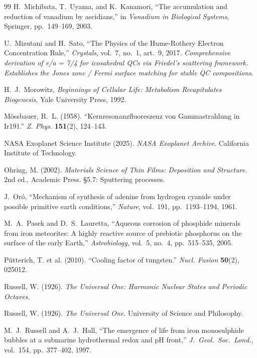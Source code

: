 \documentclass[12pt,oneside]{book}
\begin{document}
\begin{thebibliography}{99}
H.~Michibata, T.~Uyama, and K.~Kanamori,
``The accumulation and reduction of vanadium by ascidians,''
in \emph{Vanadium in Biological Systems}, Springer, pp.~149--169, 2003.

U.~Mizutani and H.~Sato,
``The Physics of the Hume-Rothery Electron Concentration Rule,''
\emph{Crystals}, vol.~7, no.~1, art.~9, 2017.
\textit{Comprehensive derivation of e/a = 7/4 for icosahedral QCs via Friedel's scattering framework. Establishes the Jones zone / Fermi surface matching for stable QC compositions.}

H.~J.~Morowitz,
\emph{Beginnings of Cellular Life: Metabolism Recapitulates Biogenesis},
Yale University Press, 1992.

M\"ossbauer, R.~L. (1958).
``Kernresonanzfluoreszenz von Gammastrahlung in Ir191.''
\textit{Z. Phys.} \textbf{151}(2), 124--143.

NASA Exoplanet Science Institute (2025).
\textit{NASA Exoplanet Archive}. California Institute of Technology.

Ohring, M. (2002).
\textit{Materials Science of Thin Films: Deposition and Structure}.
2nd ed., Academic Press. \S5.7: Sputtering processes.

J.~Or\'o,
``Mechanism of synthesis of adenine from hydrogen cyanide under possible primitive earth conditions,''
\emph{Nature}, vol.~191, pp.~1193--1194, 1961.

M.~A.~Pasek and D.~S.~Lauretta,
``Aqueous corrosion of phosphide minerals from iron meteorites: A highly reactive source of prebiotic phosphorus on the surface of the early Earth,''
\emph{Astrobiology}, vol.~5, no.~4, pp.~515--535, 2005.

P\"utterich, T. et al. (2010).
``Cooling factor of tungsten.''
\textit{Nucl. Fusion} \textbf{50}(2), 025012.

Russell, W. (1926).
\textit{The Universal One: Harmonic Nuclear States and Periodic Octaves}.

Russell, W. (1926).
\textit{The Universal One}. University of Science and Philosophy.

M.~J.~Russell and A.~J.~Hall,
``The emergence of life from iron monosulphide bubbles at a submarine hydrothermal
redox and pH front,''
\emph{J.\ Geol.\ Soc.\ Lond.}, vol.~154, pp.~377--402, 1997.


\end{thebibliography}
\end{document}
